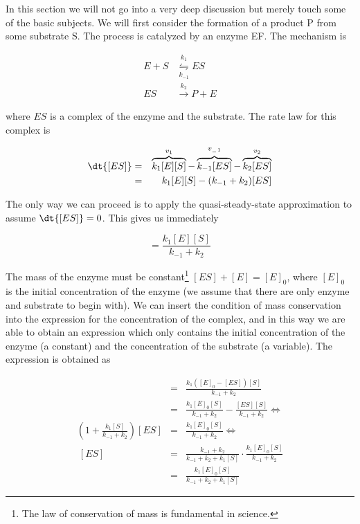 In this section we will not go into a very deep discussion but merely touch some of the basic subjects. We will first consider the formation of a product P from some substrate S. The process is catalyzed by an enzyme EF. The mechanism is

\begin{eqnarray}
    E + S &\overset{k_1}{\underset{k_{-1}}{\leftrightharpoons}} ES \\
    ES    &\overset{k_2}{\rightarrow} P + E
\end{eqnarray}

where $ES$ is a complex of the enzyme and the substrate. The rate law for this complex is

\begin{eqnarray*}
    \dt{[ES]} &=& \overbrace{k_1[E][S]}^{v_1} - \overbrace{k_{-1}[ES]}^{v_{_-1}} - \overbrace{k_2[ES]}^{v_2} \\
              &=& k_1[E][S] - (k_{-1} + k_2) [ES]
\end{eqnarray*}

The only way we can proceed is to apply the quasi-steady-state approximation \ie to assume $\dt{[ES]} = 0$. This gives us immediately

\begin{equation}
    [ES] = \frac{k_1[E][S]}{k_{-1} + k_2}
\end{equation}

The mass of the enzyme must be constant\footnote{The law of conservation of mass is fundamental in science.} \ie $[ES]+[E] = [E]_0$, where $[E]_0$ is the initial concentration of the enzyme (we assume that there are only enzyme and substrate to begin with). We can insert the condition of mass conservation into the expression for the concentration of the complex, and in this way we are able to obtain an expression which only contains the initial concentration of the enzyme (a constant) and the concentration of the substrate (a variable). The expression is obtained as

\begin{eqnarray*}
    [ES] &=& \frac{k_1([E]_0 - [ES])[S]}{k_{-1} + k_2} \\
         &=& \frac{k_1[E]_0[S]}{k_{-1} + k_2} - \frac{[ES][S]}{k_{-1} + k_2} \Leftrightarrow \\
    \left( 1 + \frac{k_1[S]}{k_{-1} + k_2} \right) [ES] &=& \frac{k_1[E]_0[S]}{k_{-1} + k_2} \Leftrightarrow \\ \ %
    [ES] &=& \frac{k_{-1} + k_2}{k_{-1} + k_2 + k_1[S]} \cdot \frac{k_1[E]_0[S]}{k_{-1} + k_2} \\
         &=& \frac{k_1[E]_0[S]}{k_{-1} + k_2 + k_1[S]}
\end{eqnarray*}

